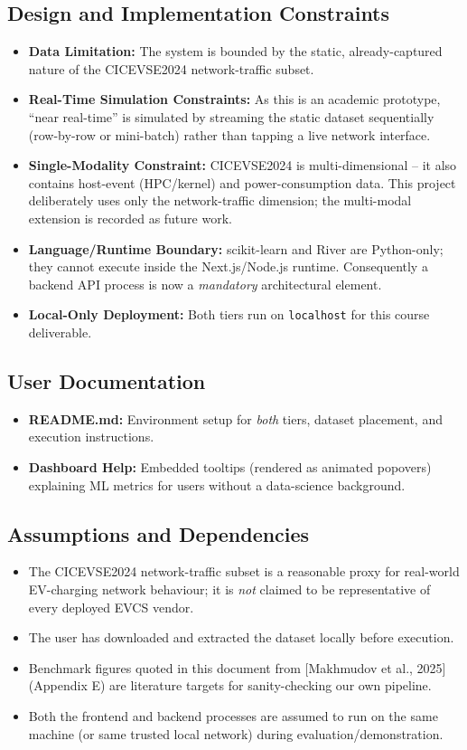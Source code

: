 \documentclass[11pt, a4paper]{article}
\begin{document}
\subsection{Design and Implementation Constraints}
\begin{itemize}
    \item \textbf{Data Limitation:} The system is bounded by the static, already-captured nature of the CICEVSE2024 network-traffic subset.
    \item \textbf{Real-Time Simulation Constraints:} As this is an academic prototype, ``near real-time'' is simulated by streaming the static dataset sequentially (row-by-row or mini-batch) rather than tapping a live network interface.
    \item \textbf{Single-Modality Constraint:} CICEVSE2024 is multi-dimensional – it also contains host-event (HPC/kernel) and power-consumption data. This project deliberately uses only the network-traffic dimension; the multi-modal extension is recorded as future work.
    \item \textbf{Language/Runtime Boundary:} scikit-learn and River are Python-only; they cannot execute inside the Next.js/Node.js runtime. Consequently a backend API process is now a \textit{mandatory} architectural element.
    \item \textbf{Local-Only Deployment:} Both tiers run on \texttt{localhost} for this course deliverable.
\end{itemize}

\subsection{User Documentation}
\begin{itemize}
    \item \textbf{README.md:} Environment setup for \textit{both} tiers, dataset placement, and execution instructions.
    \item \textbf{Dashboard Help:} Embedded tooltips (rendered as animated popovers) explaining ML metrics for users without a data-science background.
\end{itemize}

\subsection{Assumptions and Dependencies}
\begin{itemize}
    \item The CICEVSE2024 network-traffic subset is a reasonable proxy for real-world EV-charging network behaviour; it is \textit{not} claimed to be representative of every deployed EVCS vendor.
    \item The user has downloaded and extracted the dataset locally before execution.
    \item Benchmark figures quoted in this document from [Makhmudov et al., 2025] (Appendix E) are literature targets for sanity-checking our own pipeline.
    \item Both the frontend and backend processes are assumed to run on the same machine (or same trusted local network) during evaluation/demonstration.
\end{itemize}
\end{document}
